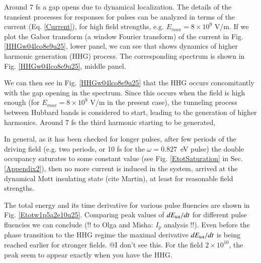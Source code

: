 Around 7 fs a gap opens due to dynamical localization.
The details of the transient processes for responses for pulses 
can be analyzed in terms of the current (Eq. \ref{Current}),
for high field strengths, e.g. $E_{max}=8\times 10^{9}$ V/m.
If we plot the Gabor transform (a window Fourier transform) of the current in 
Fig. \ref{HHGw04lco8e9u25}, lower panel, we can 
see that shows dynamics of higher harmonic generation (HHG) process. 
The corresponding spectrum is shown in Fig. \ref{HHGw04lco8e9u25}, middle panel.  
{\color{red}{@HA Is the Gabor transform really meaningful for such a short 
time interval (~ 1.2 fs, which is much shorter than the 
pulse period as displayed }}
{\color{blue}{@EG the width of Gabor window was 3 fs in FWHM, actual time window is wider due to it's Gaussian nature,so it makes sense. Also, we checked ordinary FT over all time, it shows the same peak positions of current in frequency space.}}

We can then see in Fig. \ref{HHGw04lco8e9u25} that 
the HHG occurs concomitantly with the gap opening in the 
spectrum.  
Since this occurs when the field is high enough 
(for $E_{max}=8\times 10^{9}$ V/m in the present case), 
the tunneling process between Hubbard bands 
is considered to start, leading to the generation of higher harmonics.  
Around 7 fs the third harmonic starting to be generated, 

In general, as it has been checked for longer pulses, after few periods of the driving field (e.g. two periods, or 10 fs for the $\omega=0.827$~eV pulse) the double occupancy saturates to some constant value (see Fig. \ref{EtotSaturation} in Sec. \ref{Appendix2}), 
then no more current is induced in the system, arrived at 
the dynamical Mott insulating state (cite Martin), at least for reasonable field strengths. 

The total energy and its time derivative for various pulse fluencies are shown in Fig. \ref{Etotw1p5a2e10u25}. Comparing peak values of $dE_{\rm tot}/dt$ for different pulse fluencies we can conclude (!! to Olga and Misha: $I_p$ analysis !!). Even before the phase transition to the HHG regime the maximal derivative $dE_{\rm tot}/dt$ is being reached earlier for stronger fields. @I don't see this.  For the field $2\times10^{10}$, the peak seem to appear exactly when you have the HHG.  

